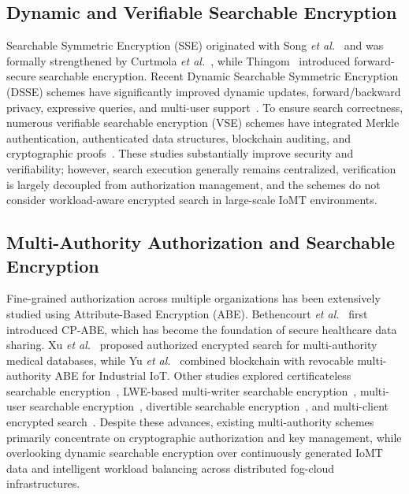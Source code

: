 \documentclass{ieeetj}
\theoremstyle{ieee-style}
\begin{document}
\subsection{Dynamic and Verifiable Searchable Encryption}

Searchable Symmetric Encryption (SSE) originated with Song \textit{et al.}~\cite{ref39} and was formally strengthened by Curtmola \textit{et al.}~\cite{ref40}, while Thingom~\cite{ref41} introduced forward-secure searchable encryption. Recent Dynamic Searchable Symmetric Encryption (DSSE) schemes have significantly improved dynamic updates, forward/backward privacy, expressive queries, and multi-user support~\cite{ref29,ref33,ref35,ref36,ref37,ref38,ref42,ref45}. To ensure search correctness, numerous verifiable searchable encryption (VSE) schemes have integrated Merkle authentication, authenticated data structures, blockchain auditing, and cryptographic proofs~\cite{ref7,ref8,ref9,ref10,ref11,ref12,ref13,ref14,ref22,ref23,ref24,ref25,ref30,ref31,ref32,ref43,ref46}. These studies substantially improve security and verifiability; however, search execution generally remains centralized, verification is largely decoupled from authorization management, and the schemes do not consider workload-aware encrypted search in large-scale IoMT environments.

\subsection{Multi-Authority Authorization and Searchable Encryption}

Fine-grained authorization across multiple organizations has been extensively studied using Attribute-Based Encryption (ABE). Bethencourt \textit{et al.}~\cite{ref27} first introduced CP-ABE, which has become the foundation of secure healthcare data sharing. Xu \textit{et al.}~\cite{ref26} proposed authorized encrypted search for multi-authority medical databases, while Yu \textit{et al.}~\cite{ref28} combined blockchain with revocable multi-authority ABE for Industrial IoT. Other studies explored certificateless searchable encryption~\cite{ref19}, LWE-based multi-writer searchable encryption~\cite{ref16}, multi-user searchable encryption~\cite{ref17}, divertible searchable encryption~\cite{ref18}, and multi-client encrypted search~\cite{ref15}. Despite these advances, existing multi-authority schemes primarily concentrate on cryptographic authorization and key management, while overlooking dynamic searchable encryption over continuously generated IoMT data and intelligent workload balancing across distributed fog-cloud infrastructures.
\end{document}
